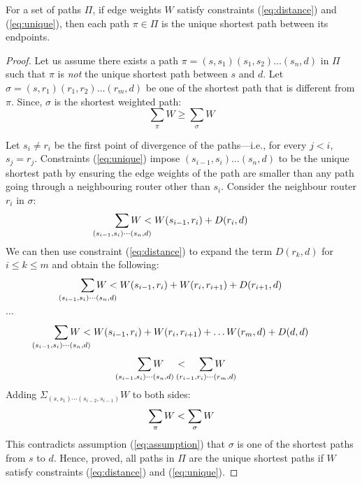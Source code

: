 \begin{theorem}[Soundness]
For a set of paths $\Pi$, if edge weights 
$W$ satisfy constraints (\ref{eq:distance}) and (\ref{eq:unique}), then 
each path $\pi \in \Pi$ is the unique shortest path between its endpoints. 
\end{theorem}
\iffull
\begin{proof}
	Let us assume there exists a path $\pi
	= (s, s_1)(s_1, s_2) 
	\ldots (s_n, d)$ in $\Pi$ such that $\pi$ is \emph{not} the unique 
	shortest path between $s$ and $d$. Let  $\sigma = (s, r_1)(r_1, r_2)\ldots (r_m,
	 d)$ be one of the shortest path that is different from $\pi$. 	
	\noindent Since, $\sigma$ is the shortest weighted path: 
	\begin{equation} \label{eq:assumption}
	\sum_{\pi} W \geq \sum_{\sigma} W
	\end{equation}
	
	Let $s_i \not= r_i$ be the first point of divergence of the paths---i.e., for every $j<i$, $s_{j} = r_{j}$.
    Constraints (\ref{eq:unique}) 
	impose $(s_{i-1}, s_i)\ldots(s_n, d)$ to be the
	unique shortest path by ensuring the edge weights of the path
	are smaller than any path going through a neighbouring 
	router other than $s_i$. 
	Consider the 
	neighbour router $r_i$ in $\sigma$:
	\[
	\sum_{\mathclap{\substack{(s_{i-1}, s_i)\cdots(s_n, d)}}} 
	W < W(s_{i-1}, r_i)+ D(r_i, d)
	\]
	We can then use constraint (\ref{eq:distance}) to expand the term $D(r_k, d)$ for $i \leq k \leq m$
	and obtain the following: 
	\[
	\sum_{\mathclap{\substack{(s_{i-1}, s_i)\cdots(s_n, d)}}} 
	W < W(s_{i-1}, r_i)+ W(r_i, r_{i+1}) + D(r_{i+1}, d)
	\] 
	\begin{center}
		$\ldots$
	\end{center}
	\[
	\sum_{\mathclap{\substack{(s_{i-1}, s_i)\cdots(s_n, d)}}} 
	W < W(s_{i-1}, r_i)+ W(r_i, r_{i+1}) + \ldots W(r_{m}, d) + D(d, d)
	\] 
	\[
	\sum_{\mathclap{\substack{(s_{i-1}, s_i)\cdots(s_n, d)}}} 
	W \hspace{0.4cm}< \hspace{0.4cm}
	\sum_{\mathclap{\substack{(r_{i-1}, r_i)\cdots(r_m, d)}}} 
	W
	\]
	Adding $\Sigma_{(s, s_1)\cdots(s_{i-2},s_{i-1})}W$ to both sides:
	\[
	\sum_{\mathclap{\substack{\pi}}} 
	W < 
	\sum_{\mathclap{\substack{\sigma}}} 
	W
	\] 
	This contradicts assumption (\ref{eq:assumption}) that 
	$\sigma$ is one of the shortest paths from $s$ to $d$. 
	Hence, proved, all paths in $\Pi$ are the unique shortest paths if $W$
	satisfy constraints (\ref{eq:distance}) and (\ref{eq:unique}).
\end{proof}
\fi

